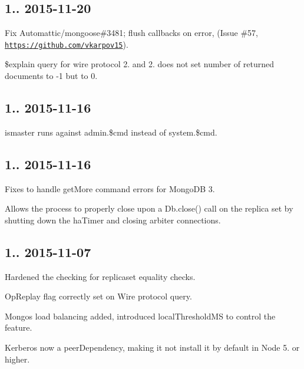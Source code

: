 \subsection*{1.. 2015-\/11-\/20 }


\begin{DoxyItemize}
\item Fix Automattic/mongoose\#3481; flush callbacks on error, (Issue \#57, \href{https://github.com/vkarpov15}{\tt https\+://github.\+com/vkarpov15}).
\item \$explain query for wire protocol 2. and 2. does not set number of returned documents to -\/1 but to 0.
\end{DoxyItemize}

\subsection*{1.. 2015-\/11-\/16 }


\begin{DoxyItemize}
\item ismaster runs against admin.\$cmd instead of system.\$cmd.
\end{DoxyItemize}

\subsection*{1.. 2015-\/11-\/16 }


\begin{DoxyItemize}
\item Fixes to handle get\+More command errors for Mongo\+DB 3.
\item Allows the process to properly close upon a Db.\+close() call on the replica set by shutting down the ha\+Timer and closing arbiter connections.
\end{DoxyItemize}

\subsection*{1.. 2015-\/11-\/07 }


\begin{DoxyItemize}
\item Hardened the checking for replicaset equality checks.
\item Op\+Replay flag correctly set on Wire protocol query.
\item Mongos load balancing added, introduced local\+Threshold\+MS to control the feature.
\item Kerberos now a peer\+Dependency, making it not install it by default in Node 5. or higher.
\end{DoxyItemize}

